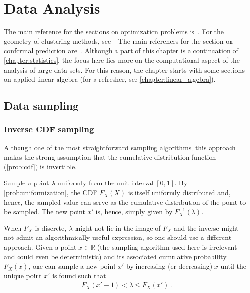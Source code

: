\chapter{Data Analysis}

    The main reference for the sections on optimization problems is~\citet{shewchuk_introduction_1994}. For the geometry of clustering methods, see~\citet{boissonnat_bregman_2010}. The main references for the section on conformal prediction are~\citet{shafer_tutorial_2008,vovk_algorithmic_2005}. Although a part of this chapter is a continuation of \cref{chapter:statistics}, the focus here lies more on the computational aspect of the analysis of large data sets. For this reason, the chapter starts with some sections on applied linear algebra (for a refresher, see \cref{chapter:linear_algebra}).

    \minitoc

\section{Data sampling}
\subsection{Inverse CDF sampling}

    Although one of the most straightforward sampling algorithms, this approach makes the strong assumption that the cumulative distribution function (\cref{prob:cdf}) is invertible.

    \begin{method}
        Sample a point $\lambda$ uniformly from the unit interval $[0,1]$. By \cref{prob:uniformization}, the CDF $F_X(X)$ is itself uniformly distributed and, hence, the sampled value can serve as the cumulative distribution of the point to be sampled. The new point $x'$ is, hence, simply given by $F^{-1}_X(\lambda)$.

        When $F_X$ is discrete, $\lambda$ might not lie in the image of $F_X$ and the inverse might not admit an algorithmically useful expression, so one should use a different approach. Given a point $x\in\mathbb{R}$ (the sampling algorithm used here is irrelevant and could even be deterministic) and its associated cumulative probability $F_X(x)$, one can sample a new point $x'$ by increasing (or decreasing) $x$ until the unique point $x'$ is found such that
        \begin{gather}
            F_X(x'-1)<\lambda\leq F_X(x')\,.
        \end{gather}
    \end{method}

